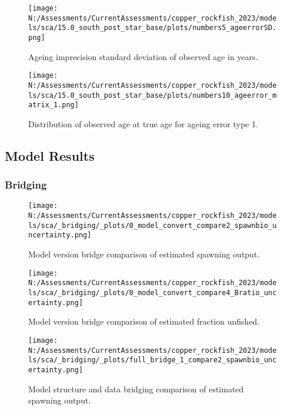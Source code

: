 \documentclass[11pt,
  english,
  letterpaper,
]{article}
\begin{document}
\pagebreak

\begin{figure}
\centering
\texttt{[image: N:/Assessments/CurrentAssessments/copper\_rockfish\_2023/models/sca/15.0\_south\_post\_star\_base/plots/numbers5\_ageerrorSD.png]}
\caption{Ageing imprecision standard deviation of observed age in years.\label{fig:age-error}}
\end{figure}

\pagebreak

\begin{figure}
\centering
\texttt{[image: N:/Assessments/CurrentAssessments/copper\_rockfish\_2023/models/sca/15.0\_south\_post\_star\_base/plots/numbers10\_ageerror\_matrix\_1.png]}
\caption{Distribution of observed age at true age for ageing error type 1.\label{fig:age-error-matrix}}
\end{figure}

\pagebreak

\hypertarget{model-results}{%
\subsection{Model Results}\label{model-results}}

\hypertarget{bridging}{%
\subsubsection{Bridging}\label{bridging}}

\begin{figure}
\centering
\texttt{[image: N:/Assessments/CurrentAssessments/copper\_rockfish\_2023/models/sca/\_bridging/\_plots/0\_model\_convert\_compare2\_spawnbio\_uncertainty.png]}
\caption{Model version bridge comparison of estimated spawning output.\label{fig:bridge-ssb}}
\end{figure}

\pagebreak

\begin{figure}
\centering
\texttt{[image: N:/Assessments/CurrentAssessments/copper\_rockfish\_2023/models/sca/\_bridging/\_plots/0\_model\_convert\_compare4\_Bratio\_uncertainty.png]}
\caption{Model version bridge comparison of estimated fraction unfished.\label{fig:bridge-depl}}
\end{figure}

\pagebreak

\begin{figure}
\centering
\texttt{[image: N:/Assessments/CurrentAssessments/copper\_rockfish\_2023/models/sca/\_bridging/\_plots/full\_bridge\_1\_compare2\_spawnbio\_uncertainty.png]}
\caption{Model structure and data bridging comparison of estimated spawning output.\label{fig:data-bridge-ssb-1}}
\end{figure}
\end{document}
